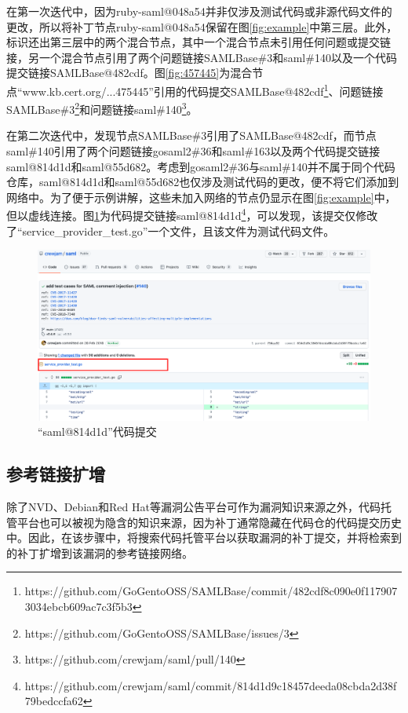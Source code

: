 \begin{exmp}
在第一次迭代中，因为ruby-saml@048a54并非仅涉及测试代码或非源代码文件的更改，所以\tool 将补丁节点ruby-saml@048a54保留在图\ref{fig:example}中第三层。此外，\tool 标识还出第三层中的两个混合节点，其中一个混合节点未引用任何问题或提交链接，另一个混合节点引用了两个问题链接SAMLBase\#3和saml\#140以及一个代码提交链接SAMLBase@482cdf。图\ref{fig:457445}为混合节点“www.kb.cert.org/...475445”引用的代码提交SAMLBase@482cdf\footnote{https://github.com/GoGentoOSS/SAMLBase/commit/482cdf8c090e0f1179073034ebcb609ac7c3f5b3}、问题链接SAMLBase\#3\footnote{https://github.com/GoGentoOSS/SAMLBase/issues/3}和问题链接saml\#140\footnote{https://github.com/crewjam/saml/pull/140}。

在第二次迭代中，\tool 发现节点SAMLBase\#3引用了SAMLBase@482cdf，而节点saml\#140引用了两个问题链接gosaml2\#36和saml\#163以及两个代码提交链接saml@814d1d和saml@55d682。考虑到gosaml2\#36与saml\#140并不属于同个代码仓库，saml@814d1d和saml@55d682也仅涉及测试代码的更改，\tool 便不将它们添加到网络中。为了便于示例讲解，这些未加入网络的节点仍显示在图\ref{fig:example}中，但以虚线连接。图\ref{fig:814d1d9}为代码提交链接saml@814d1d\footnote{https://github.com/crewjam/saml/commit/814d1d9c18457deeda08cbda2d38f79bedccfa62}，可以发现，该提交仅修改了“service\_provider\_test.go”一个文件，且该文件为测试代码文件。
\end{exmp}

\begin{figure}[!t]
    \centering
    \includegraphics[scale=0.29]{fig/commit-814d1d9}
    \caption{“saml@814d1d”代码提交}\label{fig:814d1d9}
\end{figure}

\subsection{参考链接扩增}\label{sec:addGithub}
除了NVD、Debian和Red Hat等漏洞公告平台可作为漏洞知识来源之外，代码托管平台也可以被视为隐含的知识来源，因为补丁通常隐藏在代码仓的代码提交历史中。因此，在该步骤中，\tool 将搜索代码托管平台以获取漏洞的补丁提交，并将检索到的补丁扩增到该漏洞的参考链接网络。

